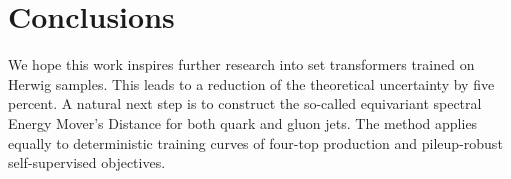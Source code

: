\section{Conclusions}\label{sec:conclusions}

We hope this work inspires further research into set transformers
trained on Herwig samples. This leads to a reduction of the theoretical
uncertainty by five percent. A natural next step is to construct the
so-called equivariant spectral Energy Mover's Distance for both quark
and gluon jets. The method applies equally to deterministic training
curves of four-top production and pileup-robust self-supervised
objectives.

